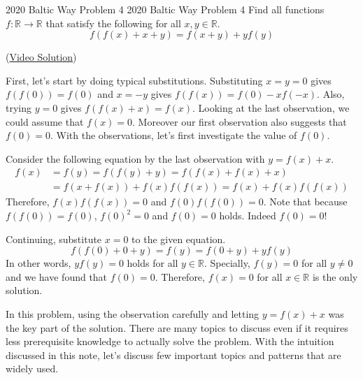 \documentclass[../../../main.tex]{subfiles}
\begin{document}
\begin{problem}
{2020 Baltic Way Problem 4 \easy}
{2020 Baltic Way Problem 4}
Find all functions $f: \mathbb{R} \rightarrow \mathbb{R}$ that
satisfy the following for all $x, y \in \mathbb{R}$.
\[
f(f(x) + x + y) = f(x + y) + yf(y)
\]
\end{problem}
(\href{https://youtu.be/STy74sON1Ho}{Video Solution})
\begin{solution}
First, let's start by doing typical substitutions. Substituting
$x = y = 0$ gives $f(f(0)) = f(0)$ and $x = -y$ gives
$f(f(x)) = f(0) - xf(-x)$. Also, trying $y = 0$ gives $f(f(x) + x)
= f(x)$. Looking at the last observation, we could assume that
$f(x) = 0$. Moreover our first observation also suggests that
$f(0) = 0$. With the observations, let's first investigate the
value of $f(0)$.

Consider the following equation by the last observation with
$y = f(x) + x$.
\begin{align*}
    f(x)
    &= f(y)
    = f(f(y) + y)
    = f(f(x) + f(x) + x) \\
    &= f(x + f(x)) + f(x) f(f(x))
    = f(x) + f(x) f(f(x))
\end{align*}
Therefore, $f(x) f(f(x)) = 0$ and $f(0) f(f(0)) = 0$. Note that
because $f(f(0)) = f(0)$, $f(0)^2 = 0$ and $f(0) = 0$ holds.
Indeed $f(0) = 0$!

Continuing, substitute $x = 0$ to the given equation.
\[
f(f(0) + 0 + y)
= f(y)
= f(0 + y) + y f(y)
\]
In other words, $y f(y) = 0$ holds for all $y \in \mathbb{R}$.
Specially, $f(y) = 0$ for all $y \neq 0$ and we have found that
$f(0) = 0$. Therefore, $f(x) = 0$ for all $x \in \mathbb{R}$ is
the only solution.
\end{solution}

In this problem, using the observation carefully and letting
$y = f(x) + x$ was the key part of the solution. There are
many topics to discuss even if it requires less prerequisite
knowledge to actually solve the problem. With the intuition
discussed in this note, let's discuss few important topics and
patterns that are widely used.
\end{document}
